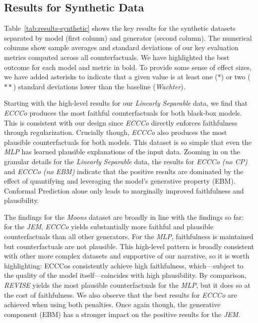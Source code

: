 \documentclass{article}
\begin{document}
\subsection{Results for Synthetic Data}

Table~\ref{tab:results-synthetic} shows the key results for the synthetic datasets separated by model (first column) and generator (second column). The numerical columns show sample averages and standard deviations of our key evaluation metrics computed across all counterfactuals. We have highlighted the best outcome for each model and metric in bold. To provide some sense of effect sizes, we have added asterisks to indicate that a given value is at least one ($*$) or two ($**$) standard deviations lower than the baseline (\textit{Wachter}).

Starting with the high-level results for our \textit{Linearly Separable} data, we find that \textit{ECCCo} produces the most faithful counterfactuals for both black-box models. This is consistent with our design since \textit{ECCCo} directly enforces faithfulness through regularization. Crucially though, \textit{ECCCo} also produces the most plausible counterfactuals for both models. This dataset is so simple that even the \textit{MLP} has learned plausible explanations of the input data. Zooming in on the granular details for the \textit{Linearly Separable} data, the results for \textit{ECCCo (no CP)} and \textit{ECCCo (no EBM)} indicate that the positive results are dominated by the effect of quantifying and leveraging the model's generative property (EBM). Conformal Prediction alone only leads to marginally improved faithfulness and plausibility.

The findings for the \textit{Moons} dataset are broadly in line with the findings so far: for the \textit{JEM}, \textit{ECCCo} yields substantially more faithful and plausible counterfactuals than all other generators. For the \textit{MLP}, faithfulness is maintained but counterfactuals are not plausible. This high-level pattern is broadly consistent with other more complex datasets and supportive of our narrative, so it is worth highlighting: ECCCos consistently achieve high faithfulness, which---subject to the quality of the model itself---coincides with high plausibility. By comparison, \textit{REVISE} yields the most plausible counterfactuals for the \textit{MLP}, but it does so at the cost of faithfulness. We also observe that the best results for \textit{ECCCo} are achieved when using both penalties. Once again though, the generative component (EBM) has a stronger impact on the positive results for the \textit{JEM}.
\end{document}

